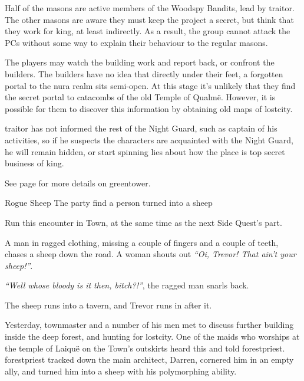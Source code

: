 \begin{multicols}{2}
\begin{boxtext}
\end{boxtext}

Half of the masons are active members of the Woodspy Bandits, lead by \gls{traitor}.
The other masons are aware they must keep the project a secret, but think that they work for \gls{king}, at least indirectly.
As a result, the group cannot attack the PCs without some way to explain their behaviour to the regular masons.

The players may watch the building work and report back, or confront the builders.
The builders have no idea that directly under their feet, a forgotten portal to the nura realm sits semi-open.
At this stage it's unlikely that they find the secret portal to catacombs of the old Temple of Qualm\"{e}.
However, it is possible for them to discover this information by obtaining old maps of \gls{lostcity}.

\Gls{traitor} has not informed the rest of the Night Guard, such as \gls{captain} of his activities, so if he suspects the characters are acquainted with the Night Guard, he will remain hidden, or start spinning lies about how the place is top secret business of \gls{king}.

See page \pageref{green_tower} for more details on \gls{greentower}.

{Rogue Sheep}%
{The party find a person turned into a sheep}%

Run this encounter in Town, at the same time as the next Side Quest's part.

\begin{boxtext}

	A man in ragged clothing, missing a couple of fingers and a couple of teeth, chases a sheep down the road.  A woman shouts out \emph{``Oi, Trevor! That ain't your sheep!''}.

	\emph{``Well whose bloody is it then, bitch?!''}, the ragged man snarls back.

	The sheep runs into a tavern, and Trevor runs in after it.

\end{boxtext}

Yesterday, \gls{townmaster} and a number of his men met to discuss further building inside the deep forest, and hunting for \gls{lostcity}.
One of the maids who worships at the temple of Laiqu\"{e} on the Town's outskirts heard this and told \gls{forestpriest}.
\Gls{forestpriest} tracked down the main architect, Darren, cornered him in an empty ally, and turned him into a sheep with his polymorphing ability.


\end{multicols}
